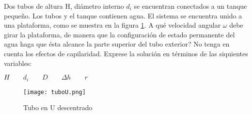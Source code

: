 \item Dos tubos de altura H, diámetro interno $d_i$ se encuentran conectados a un tanque pequeño. Los tubos y el tanque contienen agua. El sistema se encuentra unido a una plataforma, como se muestra en la figura \ref{fig:tuboU}. A qué velocidad angular $\omega$ debe girar la plataforma, de manera que la configuración de estado permanente del agua haga que ésta alcance la parte superior del tubo exterior? No tenga en cuenta los efectos de capilaridad. Exprese la solución en términos de las siquientes variables:

\begin{center}
$H \qquad d_i \qquad D \qquad \Delta h \qquad r$
\end{center}

\begin{figure}[h!!!!]
\centering
\texttt{[image: tuboU.png]}
\caption{Tubo en U descentrado}
\label{fig:tuboU}
\end{figure}
